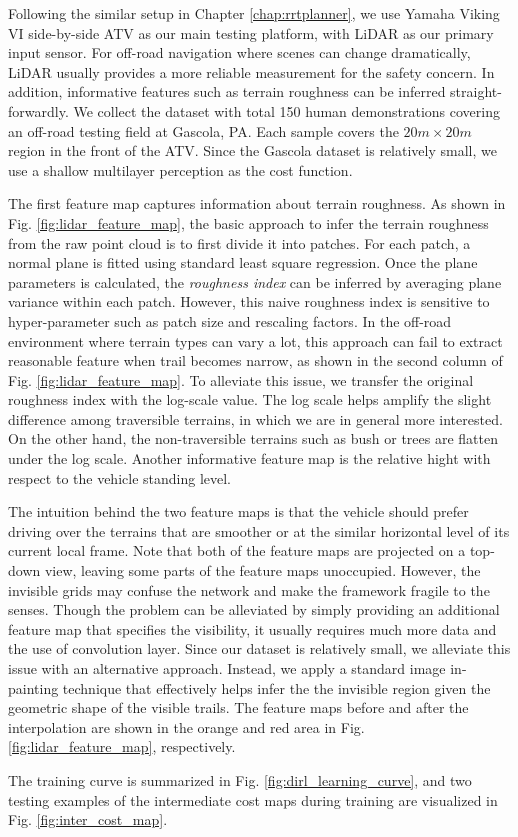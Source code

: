 \documentclass[../thesis.tex]{subfiles}
\begin{document}
Following the similar setup in Chapter \ref{chap:rrtplanner}, we use Yamaha Viking VI side-by-side ATV as our main testing platform, with LiDAR as our primary input sensor. 
For off-road navigation where scenes can change dramatically, LiDAR usually provides a more reliable measurement for the safety concern.
In addition, informative features such as terrain roughness can be inferred straight-forwardly.
We collect the dataset with total 150 human demonstrations covering an off-road testing field at Gascola, PA. Each sample covers the $20m \times 20m$ region in the front of the ATV. Since the Gascola dataset is relatively small, we use a shallow multilayer perception as the cost function. 

The first feature map captures information about terrain roughness.
As shown in Fig. \ref{fig:lidar_feature_map}, the basic approach to infer the terrain roughness from the raw point cloud is to first divide it into patches. 
For each patch, a normal plane is fitted using standard least square regression. 
Once the plane parameters is calculated, the \textit{roughness index} can be inferred by averaging plane variance within each patch. 
However, this naive roughness index is sensitive to hyper-parameter such as patch size and rescaling factors. 
In the off-road environment where terrain types can vary a lot, this approach can fail to extract reasonable feature when trail becomes narrow, as shown in the second column of Fig. \ref{fig:lidar_feature_map}. 
To alleviate this issue, we transfer the original roughness index with the log-scale value. 
The log scale helps amplify the slight difference among traversible terrains, in which we are in general more interested.
On the other hand, the non-traversible terrains such as bush or trees are flatten under the log scale. 
Another informative feature map is the relative hight with respect to the vehicle standing level. 


The intuition behind the two feature maps is that the vehicle should prefer driving over the terrains that are smoother or at the similar horizontal level of its current local frame.
Note that both of the feature maps are projected on a top-down view, leaving some parts of the feature maps unoccupied. 
However, the invisible grids may confuse the network and make the framework fragile to the senses. 
Though the problem can be alleviated by simply providing an additional feature map that specifies the visibility, it usually requires much more data and the use of convolution layer. \cite{wulfmeier2015maximum,wulfmeier2016watch}
Since our dataset is relatively small, we alleviate this issue with an alternative approach. 
Instead, we apply a standard image in-painting technique \cite{telea2004image} that effectively helps infer the the invisible region given the geometric shape of the visible trails. 
The feature maps before and after the interpolation are shown in the orange and red area in Fig. \ref{fig:lidar_feature_map}, respectively.

The training curve is summarized in Fig. \ref{fig:dirl_learning_curve}, and two testing examples of the intermediate cost maps during training are visualized in Fig. \ref{fig:inter_cost_map}. 
\end{document}
